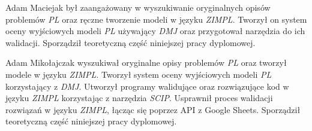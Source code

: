 Adam Maciejak był zaangażowany w wyszukiwanie oryginalnych opisów problemów \textit{PL} oraz ręczne tworzenie modeli w języku \textit{ZIMPL}. Tworzył on system oceny wyjściowych modeli \textit{PL} używający \textit{DMJ} oraz przygotował narzędzia do ich walidacji. Sporządził teoretyczną część niniejszej pracy dyplomowej.

Adam Mikołajczak wyszukiwał oryginalne opisy problemów \textit{PL} oraz tworzył modele w języku \textit{ZIMPL}. Tworzył system oceny wyjściowych modeli \textit{PL} korzystający z \textit{DMJ}. Utworzył programy walidujące oraz rozwiązujące kod w języku \textit{ZIMPL} korzystając z narzędzia \textit{SCIP}. Usprawnił proces walidacji rozwiązań w języku \textit{ZIMPL}, łącząc się poprzez API z Google Sheets. Sporządził teoretyczną część niniejszej pracy dyplomowej. 
